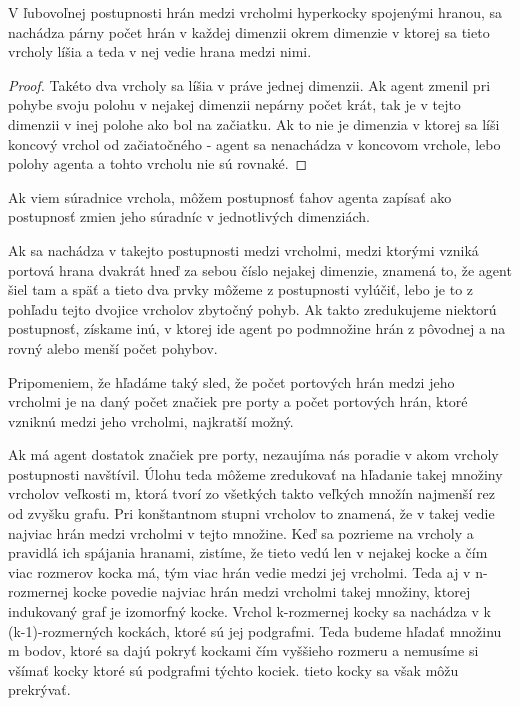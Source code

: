 \begin{lem}
V ľubovoľnej postupnosti hrán medzi vrcholmi hyperkocky spojenými hranou, sa
nachádza párny počet hrán v každej dimenzii okrem dimenzie v ktorej sa tieto
vrcholy líšia a teda v nej vedie hrana medzi nimi.
\end{lem}
\begin{proof}
Takéto dva vrcholy sa líšia v práve jednej dimenzii. Ak agent zmenil pri 
pohybe svoju polohu v nejakej dimenzii nepárny počet 
krát, tak je v tejto dimenzii v inej polohe ako bol na začiatku. Ak to nie je 
dimenzia v ktorej sa líši koncový vrchol od začiatočného - agent sa
nenachádza v koncovom vrchole, lebo polohy agenta a tohto vrcholu nie sú
rovnaké.
\end{proof}

\begin{ozn}
Ak viem súradnice vrchola, môžem postupnosť ťahov agenta zapísať ako postupnosť 
zmien jeho súradníc v jednotlivých dimenziách. 
\end{ozn}
Ak sa nachádza v takejto postupnosti medzi
vrcholmi, medzi ktorými vzniká portová hrana dvakrát hneď za sebou číslo
nejakej dimenzie, znamená to, že agent šiel tam a späť a tieto dva prvky
môžeme z postupnosti vylúčiť, lebo je to z pohľadu tejto dvojice vrcholov
zbytočný pohyb. Ak takto zredukujeme niektorú postupnosť, získame inú, v
ktorej ide agent po podmnožine hrán z pôvodnej a na rovný alebo menší počet
pohybov.
\begin{pozn}
Pripomeniem, že hľadáme taký sled, že počet portových hrán medzi jeho
vrcholmi je na daný počet značiek pre porty a počet portových hrán, ktoré
vzniknú medzi jeho vrcholmi, najkratší možný.
\end{pozn}

Ak má agent dostatok značiek pre porty, nezaujíma nás poradie v akom vrcholy
postupnosti navštívil. Úlohu teda môžeme zredukovať na hľadanie takej množiny
vrcholov veľkosti m, ktorá tvorí zo všetkých takto veľkých množín najmenší rez
od zvyšku grafu. Pri konštantnom stupni vrcholov to znamená, že v takej vedie 
najviac hrán medzi vrcholmi v tejto množine.
Keď sa pozrieme na vrcholy a pravidlá ich spájania hranami, zistíme, že
tieto vedú len v nejakej kocke a čím viac rozmerov kocka má, tým viac hrán
vedie medzi jej vrcholmi. Teda aj v n-rozmernej kocke povedie najviac hrán
medzi vrcholmi takej množiny, ktorej indukovaný graf je izomorfný kocke.
Vrchol k-rozmernej kocky sa nachádza v k (k-1)-rozmerných kockách, ktoré sú
jej podgrafmi. Teda budeme hľadať množinu m bodov, ktoré sa dajú
pokryť kockami čím vyššieho rozmeru a nemusíme si všímať kocky ktoré sú
podgrafmi týchto kociek. tieto kocky sa však môžu prekrývať.

